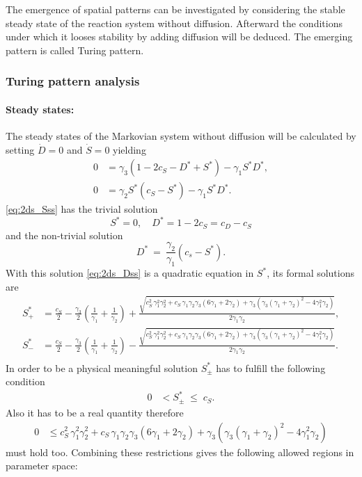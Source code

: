 The emergence of spatial patterns can be investigated by considering the stable steady state of the reaction system without diffusion. Afterward the conditions under which it looses stability by adding diffusion will be deduced. The emerging pattern is called Turing pattern.

\subsubsection{Turing pattern analysis}

\paragraph{Steady states:}

The steady states of the Markovian system without diffusion will be calculated by setting $\dot{D}=0$ and $\dot{S}=0$ yielding
%
\begin{align}
\label{eq:2ds_Dss} 0 &= \gamma_3\left(1-2c_S-D^*+S^*\right)-\gamma_1 S^* D^*,\\
\label{eq:2ds_Sss} 0 &= \gamma_2 S^* \left(c_S-S^*\right)-\gamma_1 S^* D^*. 
\end{align}
%
\eqref{eq:2ds_Sss} has the trivial solution 
%
\[
 S^*=0,\quad D^*=1-2c_S=c_D-c_S
\]
%
and the non-trivial solution
%
\begin{equation}
D^*~=~\frac{\gamma_2}{\gamma_1}\left(c_s-S^*\right). 
\label{eq:DssS} 
\end{equation}
%
With this solution \eqref{eq:2ds_Dss} is a quadratic equation in $S^*$, its formal solutions are
%
\begin{align}
 \nonumber S^*_+ &= \frac{c_S}{2}-\frac{\gamma_3}{2}\left(\frac{1}{\gamma_1}+\frac{1}{\gamma_2}\right)+\frac{\sqrt{c_S^2\,\gamma_1^2\gamma_2^2+c_S\,\gamma_1\gamma_2\gamma_3(6\gamma_1+2\gamma_2)+\gamma_3(\gamma_3(\gamma_1+\gamma_2)^2-4\gamma_1^2\gamma_2)}}{2\gamma_1\gamma_2},\\
 \nonumber S^*_- &= \frac{c_S}{2}-\frac{\gamma_3}{2}\left(\frac{1}{\gamma_1}+\frac{1}{\gamma_2}\right)-\frac{\sqrt{c_S^2\,\gamma_1^2\gamma_2^2+c_S\,\gamma_1\gamma_2\gamma_3(6\gamma_1+2\gamma_2)+\gamma_3(\gamma_3(\gamma_1+\gamma_2)^2-4\gamma_1^2\gamma_2)}}{2\gamma_1\gamma_2}.\\
 & \label{eq:Sss}
\end{align}
%
In order to be a physical meaningful solution $S^*_\pm$ has to fulfill the following condition
%
\begin{align*}
 0 &< S^*_\pm\; \leq\;c_S.
\end{align*}
%
Also it has to be a real quantity therefore
%
\begin{align*}
 0 &\leq c_S^2\,\gamma_1^2\gamma_2^2+c_S\,\gamma_1\gamma_2\gamma_3(6\gamma_1+2\gamma_2)+\gamma_3(\gamma_3(\gamma_1+\gamma_2)^2-4\gamma_1^2\gamma_2)
\end{align*}
%
must hold too. Combining these restrictions gives the following allowed regions in parameter space:

